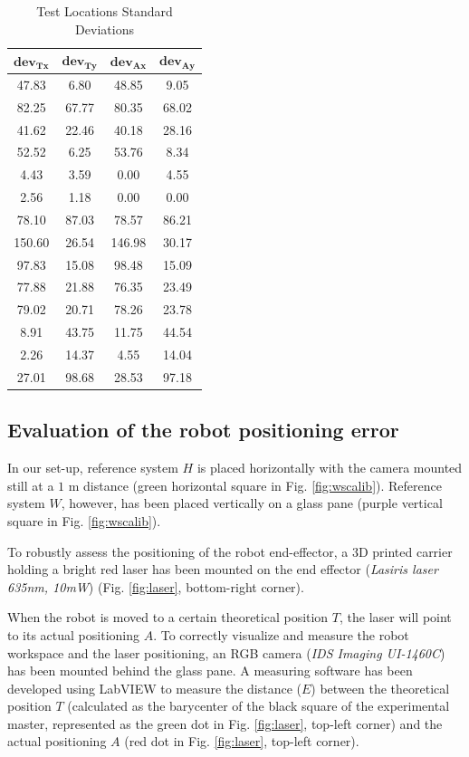 \documentclass[letterpaper, 10 pt, conference]{ieeeconf}  %
\begin{document}
\begin{table}[h]
\begin{center}
\caption{Test Locations Standard Deviations}
\label{tab:firm}
\begin{tabular}{|c||c||c||c|}
\hline
$\mathbf{dev_{Tx}}$ & $\mathbf{dev_{Ty}}$ & $\mathbf{dev_{Ax}}$ & $\mathbf{dev_{Ay}}$ \\
\hline
47.83 & 6.80 & 48.85 & 9.05\\
82.25 & 67.77 & 80.35 & 68.02\\
41.62 & 22.46 & 40.18 & 28.16\\
52.52 & 6.25 & 53.76 & 8.34\\
4.43 & 3.59 & 0.00 & 4.55\\
2.56 & 1.18 & 0.00 & 0.00\\
78.10 & 87.03 & 78.57 & 86.21\\
150.60 & 26.54 & 146.98 & 30.17\\
97.83 & 15.08 & 98.48 & 15.09\\
77.88 & 21.88 & 76.35 & 23.49\\
79.02 & 20.71 & 78.26 & 23.78\\
8.91 & 43.75 & 11.75 & 44.54\\
2.26 & 14.37 & 4.55 & 14.04\\
27.01 & 98.68 & 28.53 & 97.18\\
\hline
\end{tabular}
\end{center}
\end{table}

\subsection{Evaluation of the robot positioning error}
In our set-up, reference system $H$ is placed horizontally with the camera mounted still at a $1$ m distance (green horizontal square in Fig. \ref{fig:wscalib}). Reference system $W$, however, has been placed vertically on a glass pane (purple vertical square in Fig. \ref{fig:wscalib}).

To robustly assess the positioning of the robot end-effector, a 3D printed carrier holding a bright red laser has been mounted on the end effector (\textit{Lasiris laser 635nm, 10mW}) (Fig. \ref{fig:laser}, bottom-right corner).

When the robot is moved to a certain theoretical position $T$, the laser will point to its actual positioning $A$. To correctly visualize and measure the robot workspace and the laser positioning, an RGB camera (\textit{IDS Imaging UI-1460C}) has been mounted behind the glass pane.
A measuring software has been developed using LabVIEW to measure the distance ($E$) between the theoretical position $T$ (calculated as the barycenter of the black square of the experimental master, represented as the green dot in Fig. \ref{fig:laser}, top-left corner) and the actual positioning $A$ (red dot in Fig. \ref{fig:laser}, top-left corner).
\end{document}
